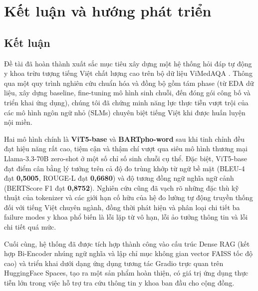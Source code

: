 \chapter{Kết luận và hướng phát triển}
\section{Kết luận}
Đề tài đã hoàn thành xuất sắc mục tiêu xây dựng một hệ thống hỏi đáp tự động y khoa trừu tượng tiếng Việt chất lượng cao trên bộ dữ liệu ViMedAQA \cite{tran2024vimedaqa}. Thông qua một quy trình nghiên cứu chuẩn hóa và đồng bộ gồm tám phase (từ EDA dữ liệu, xây dựng baseline, fine-tuning mô hình sinh chuỗi, đến đóng gói công bố và triển khai ứng dụng), chúng tôi đã chứng minh năng lực thực tiễn vượt trội của các mô hình ngôn ngữ nhỏ (SLMs) chuyên biệt tiếng Việt khi được huấn luyện nội miền.

Hai mô hình chính là \textbf{ViT5-base} và \textbf{BARTpho-word} sau khi tinh chỉnh đều đạt hiệu năng rất cao, tiệm cận và thậm chí vượt qua siêu mô hình thương mại Llama-3.3-70B zero-shot ở một số chỉ số sinh chuỗi cụ thể. Đặc biệt, ViT5-base đạt điểm cân bằng lý tưởng trên cả độ đo trùng khớp từ ngữ bề mặt (BLEU-4 đạt \textbf{0,5005}, ROUGE-L đạt \textbf{0,6680}) và độ tương đồng ngữ nghĩa ngữ cảnh (BERTScore F1 đạt \textbf{0,8752}). Nghiên cứu cũng đã vạch rõ những đặc thù kỹ thuật của tokenizer và các giới hạn cố hữu của hệ đo lường tự động truyền thống đối với tiếng Việt chuyên ngành, đồng thời phát hiện và phân loại chi tiết ba failure modes y khoa phổ biến là lỗi lặp từ vô hạn, lỗi ảo tưởng thông tin và lỗi chi tiết quá mức. 

Cuối cùng, hệ thống đã được tích hợp thành công vào cấu trúc Dense RAG (kết hợp Bi-Encoder nhúng ngữ nghĩa và lập chỉ mục không gian vector FAISS tốc độ cao) và triển khai dưới dạng ứng dụng tương tác Gradio trực quan trên HuggingFace Spaces, tạo ra một sản phẩm hoàn thiện, có giá trị ứng dụng thực tiễn lớn trong việc hỗ trợ tra cứu thông tin y khoa ban đầu cho cộng đồng.

